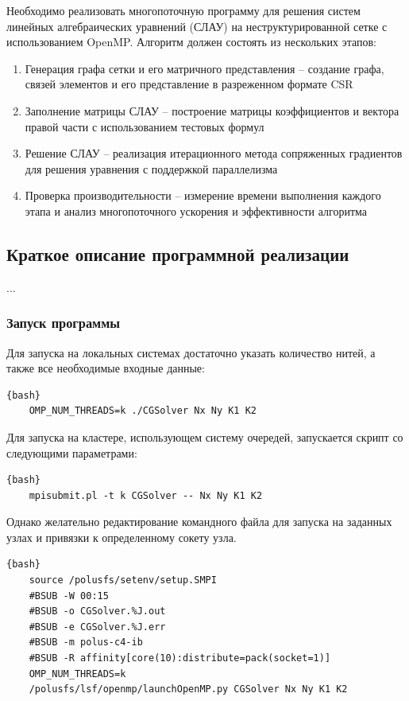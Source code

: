 \documentclass[12pt, a4paper]{article}
\begin{document}
Необходимо реализовать многопоточную программу для решения систем линейных алгебраических уравнений (СЛАУ) на неструктурированной сетке с использованием OpenMP. Алгоритм должен состоять из нескольких этапов:

\begin{enumerate}
	\item Генерация графа сетки и его матричного представления – создание графа, связей элементов и его представление в разреженном формате CSR
	\item Заполнение матрицы СЛАУ – построение матрицы коэффициентов и вектора правой части с использованием тестовых формул
	\item Решение СЛАУ – реализация итерационного метода сопряженных градиентов для решения уравнения с поддержкой параллелизма
	\item Проверка производительности – измерение времени выполнения каждого этапа и анализ многопоточного ускорения и эффективности алгоритма
\end{enumerate}


\subsection{Краткое описание программной реализации}

...

\subsubsection{Запуск программы}

Для запуска на локальных системах достаточно указать количество нитей, а также все необходимые входные данные:

\begin{lstlisting}{bash}
	OMP_NUM_THREADS=k ./CGSolver Nx Ny K1 K2
\end{lstlisting}

Для запуска на кластере, использующем систему очередей, запускается скрипт со следующими параметрами:

\begin{lstlisting}{bash}
	mpisubmit.pl -t k CGSolver -- Nx Ny K1 K2
\end{lstlisting}

Однако желательно редактирование командного файла для запуска на заданных узлах и привязки к определенному сокету узла.

\begin{lstlisting}{bash}
	source /polusfs/setenv/setup.SMPI
	#BSUB -W 00:15
	#BSUB -o CGSolver.%J.out
	#BSUB -e CGSolver.%J.err
	#BSUB -m polus-c4-ib
	#BSUB -R affinity[core(10):distribute=pack(socket=1)]
	OMP_NUM_THREADS=k
	/polusfs/lsf/openmp/launchOpenMP.py CGSolver Nx Ny K1 K2
\end{lstlisting}
\end{document}
